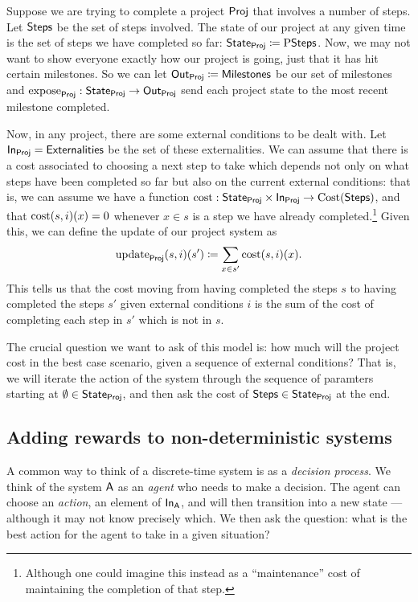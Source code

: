 \documentclass[DynamicalBook]{subfiles}
\begin{document}
\begin{example}
  Suppose we are trying to complete a project $\mathsf{Proj}$ that involves a number of steps.
  Let $\mathsf{Steps}$ be the set of steps involved. The state of our project at any given
  time is the set of steps we have completed so far: $\mathsf{State}_{\mathsf{Proj}} \coloneqq
  \mathrm{P}\mathsf{Steps}$. Now, we may not want to show everyone exactly how our
  project is going, just that it has hit certain milestones. So we can let
  $\mathsf{Out}_{\mathsf{Proj}} \coloneqq \mathsf{Milestones}$ be our set of milestones and
  $\mathrm{expose}_{\mathsf{Proj}} : \mathsf{State}_{\mathsf{Proj}} \to \mathsf{Out}_{\mathsf{Proj}}$ send each project state to the
  most recent milestone completed.

  Now, in any project, there are some external conditions
  to be dealt with. Let $\mathsf{In}_{\mathsf{Proj}} = \mathsf{Externalities}$
  be the set of these externalities. We can assume that there is a cost
  associated to choosing a next step to take which depends not only on what
  steps have been completed so far but also on the current external conditions:
  that is, we can assume we have a function $\mathrm{cost} : \mathsf{State}_{\mathsf{Proj}} \times
  \mathsf{In}_{\mathsf{Proj}} \to \mathrm{Cost}(\mathsf{Steps})$, and that $\mathrm{cost}(s, i)(x) = 0$
  whenever $x \in s$ is a step we have already completed.\footnote{Although one
    could imagine this instead as a ``maintenance'' cost of maintaining the
    completion of that step.} Given this, we can define the update
  of our project system as
  \[
\mathrm{update}_{\mathsf{Proj}}(s, i)(s') \coloneqq \sum_{x \in s'} \mathrm{cost}(s,
  i)(x).
  \]
  This tells us that the cost moving from having completed the steps $s$ to
  having completed the steps $s'$ given external conditions $i$ is the sum of
  the cost of completing each step in $s'$ which is not in $s$.

  The crucial question we want to ask of this model is: how much will the
  project cost in the best case scenario, given a sequence of external
  conditions? That is, we will iterate the action of the system through the
  sequence of paramters starting at
  $\emptyset \in \mathsf{State}_{\mathsf{Proj}}$, and then ask the cost of $\mathsf{Steps} \in
  \mathsf{State}_{\mathsf{Proj}}$ at the end. 
\end{example}

\subsection{Adding rewards to non-deterministic systems}

A common way to think of a discrete-time system is as a \emph{decision process}. We
think of the system $\mathsf{A}$ as an \emph{agent} who needs to make a decision.
The agent can choose an \emph{action}, an element of $\mathsf{In}_{\mathsf{A}}$, and will then
transition into a new state --- although it may not know precisely which. We
then ask the question: what is the best action for the agent to take in a given
situation?
\end{document}
